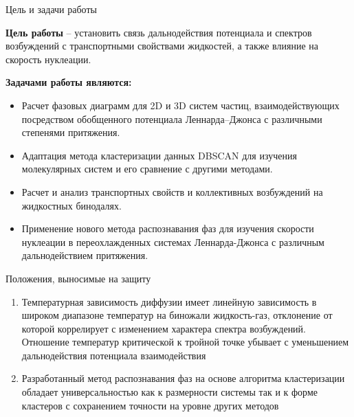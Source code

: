 \documentclass{beamer}
\begin{document}
\begin{frame}{Цель и задачи работы}
\footnotesize{

\textbf{Цель работы} -- установить связь дальнодействия потенциала и спектров возбуждений с транспортными свойствами жидкостей, а также влияние на скорость нуклеации.

\vspace{0.5cm}

\textbf{Задачами работы являются:}
\begin{itemize}
\item Расчет фазовых диаграмм для 2D и 3D систем частиц, взаимодействующих посредством обобщенного потенциала Леннарда--Джонса с различными степенями притяжения.
\item Адаптация метода кластеризации данных DBSCAN для изучения молекулярных систем и его сравнение с другими методами.
\item Расчет и анализ транспортных свойств и коллективных возбуждений на жидкостных бинодалях.
\item Применение нового метода распознавания фаз для изучения скорости нуклеации в переохлажденных системах Леннарда-Джонса с различным дальнодействием притяжения.
\end{itemize}


}
\end{frame}






\begin{frame}{Положения, выносимые на защиту}
\footnotesize{

\begin{enumerate}
\item Температурная зависимость диффузии имеет линейную зависимость в широком диапазоне температур на биножали жидкость-газ, отклонение от которой коррелирует с изменением характера спектра возбуждений. Отношение температур критической к тройной точке убывает с уменьшением дальнодействия потенциала взаимодействия
\item Разработанный метод распознавания фаз на основе алгоритма кластеризации обладает универсальностью как к размерности системы так и к форме кластеров с сохранением точности на уровне других методов
\end{enumerate}



}
\end{frame}
\end{document}
